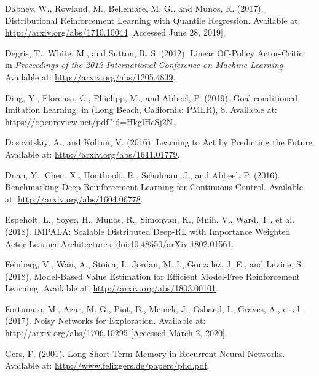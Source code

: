 \documentclass[
  letterpaper,
  DIV=11,
  numbers=noendperiod]{scrreprt}
\newlength{\cslhangindent}
\newlength{\cslentryspacingunit} %
\newenvironment{CSLReferences}[2] %
 {%
  \setlength{\parindent}{0pt}
  \ifodd #1
  \let\oldpar\par
  \def\par{\hangindent=\cslhangindent\oldpar}
  \fi
  \setlength{\parskip}{#2\cslentryspacingunit}
 }%
 {}
\begin{document}
\begin{CSLReferences}{1}{0}
\leavevmode{}%
Dabney, W., Rowland, M., Bellemare, M. G., and Munos, R. (2017).
Distributional {Reinforcement Learning} with {Quantile Regression}.
Available at: \url{http://arxiv.org/abs/1710.10044} {[}Accessed June 28,
2019{]}.

\leavevmode{}%
Degris, T., White, M., and Sutton, R. S. (2012). Linear {Off-Policy
Actor-Critic}. in \emph{Proceedings of the 2012 {International
Conference} on {Machine Learning}} Available at:
\url{http://arxiv.org/abs/1205.4839}.

\leavevmode{}%
Ding, Y., Florensa, C., Phielipp, M., and Abbeel, P. (2019).
Goal-conditioned {Imitation Learning}. in ({Long Beach, California}:
{PMLR}), 8. Available at:
\url{https://openreview.net/pdf?id=HkglHcSj2N}.

\leavevmode{}%
Dosovitskiy, A., and Koltun, V. (2016). Learning to {Act} by
{Predicting} the {Future}. Available at:
\url{http://arxiv.org/abs/1611.01779}.

\leavevmode{}%
Duan, Y., Chen, X., Houthooft, R., Schulman, J., and Abbeel, P. (2016).
Benchmarking {Deep Reinforcement Learning} for {Continuous Control}.
Available at: \url{http://arxiv.org/abs/1604.06778}.

\leavevmode{}%
Espeholt, L., Soyer, H., Munos, R., Simonyan, K., Mnih, V., Ward, T., et
al. (2018). {IMPALA}: {Scalable Distributed Deep-RL} with {Importance
Weighted Actor-Learner Architectures}.
doi:\href{https://doi.org/10.48550/arXiv.1802.01561}{10.48550/arXiv.1802.01561}.

\leavevmode{}%
Feinberg, V., Wan, A., Stoica, I., Jordan, M. I., Gonzalez, J. E., and
Levine, S. (2018). Model-{Based Value Estimation} for {Efficient
Model-Free Reinforcement Learning}. Available at:
\url{http://arxiv.org/abs/1803.00101}.

\leavevmode{}%
Fortunato, M., Azar, M. G., Piot, B., Menick, J., Osband, I., Graves,
A., et al. (2017). Noisy {Networks} for {Exploration}. Available at:
\url{http://arxiv.org/abs/1706.10295} {[}Accessed March 2, 2020{]}.

\leavevmode{}%
Gers, F. (2001). Long {Short-Term Memory} in {Recurrent Neural
Networks}. Available at: \url{http://www.felixgers.de/papers/phd.pdf}.


\end{CSLReferences}
\end{document}
